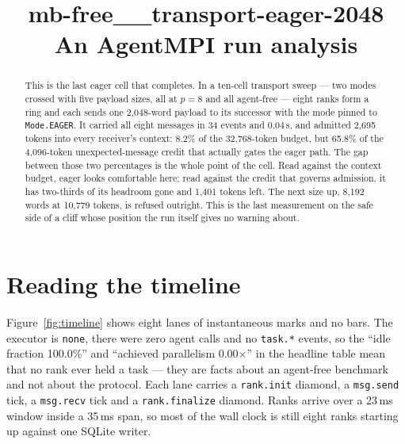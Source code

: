 \documentclass[11pt]{article}
\title{\textbf{mb-free\_\_transport-eager-2048}\\[2pt]\large An AgentMPI run analysis}
\author{}
\date{}
\begin{document}
\maketitle

\begin{abstract}
This is the last eager cell that completes. In a ten-cell transport sweep --- two
modes crossed with five payload sizes, all at $p = 8$ and all agent-free --- eight
ranks form a ring and each sends one 2{,}048-word payload to its successor with the
mode pinned to \texttt{Mode.EAGER}. It carried all eight messages in 34 events and
0.04\,s, and admitted 2{,}695 tokens into every receiver's context: 8.2\% of the
32{,}768-token budget, but 65.8\% of the 4{,}096-token unexpected-message credit that
actually gates the eager path. The gap between those two percentages is the whole
point of the cell. Read against the context budget, eager looks comfortable here;
read against the credit that governs admission, it has two-thirds of its headroom
gone and 1{,}401 tokens left. The next size up, 8{,}192 words at 10{,}779 tokens, is
refused outright. This is the last measurement on the safe side of a cliff whose
position the run itself gives no warning about.
\end{abstract}



\section{Reading the timeline}

Figure~\ref{fig:timeline} shows eight lanes of instantaneous marks and no bars. The
executor is \texttt{none}, there were zero agent calls and no \texttt{task.*} events,
so the ``idle fraction 100.0\%'' and ``achieved parallelism 0.00$\times$'' in the
headline table mean that no rank ever held a task --- they are facts about an
agent-free benchmark and not about the protocol. Each lane carries a
\texttt{rank.init} diamond, a \texttt{msg.send} tick, a \texttt{msg.recv} tick and a
\texttt{rank.finalize} diamond. Ranks arrive over a 23\,ms window inside a 35\,ms
span, so most of the wall clock is still eight ranks starting up against one SQLite
writer.
\end{document}
